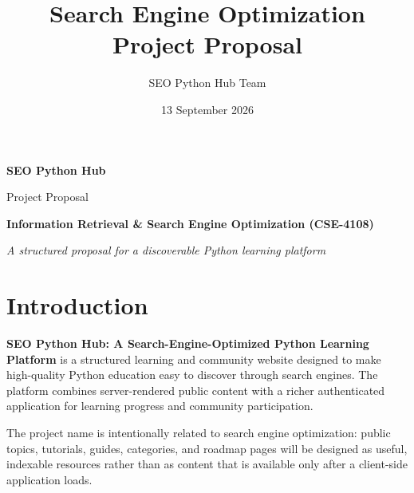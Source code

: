 \documentclass[11pt,a4paper]{article}
\title{Search Engine Optimization\\[0.35em]\large Project Proposal}
\author{SEO Python Hub Team}
\date{13 September 2026}
\begin{document}
\begin{titlepage}
  \thispagestyle{empty}
  \centering
  \vspace*{\fill}

  {\LARGE\bfseries SEO Python Hub \par}
  \vspace{0.35em}
  {\Large Project Proposal\par}

  \vspace{1.5cm}

  {\large\bfseries Information Retrieval \&  Search Engine Optimization (CSE-4108) \par}

  \vspace{1cm}

  {\itshape A structured proposal for a discoverable Python learning platform\par}

  \vspace{1cm}


  \vspace*{\fill}
\end{titlepage}

\begingroup
  \small
  \setlength{\parskip}{0pt}
  \tableofcontents
\endgroup
\clearpage

\setcounter{page}{1}

\section{Introduction}

\textbf{SEO Python Hub: A Search-Engine-Optimized Python Learning Platform} is a
structured learning and community website designed to make high-quality Python
education easy to discover through search engines. The platform combines
server-rendered public content with a richer authenticated application for
learning progress and community participation.

The project name is intentionally related to search engine optimization: public
topics, tutorials, guides, categories, and roadmap pages will be designed as
useful, indexable resources rather than as content that is available only after a
client-side application loads.
\end{document}
